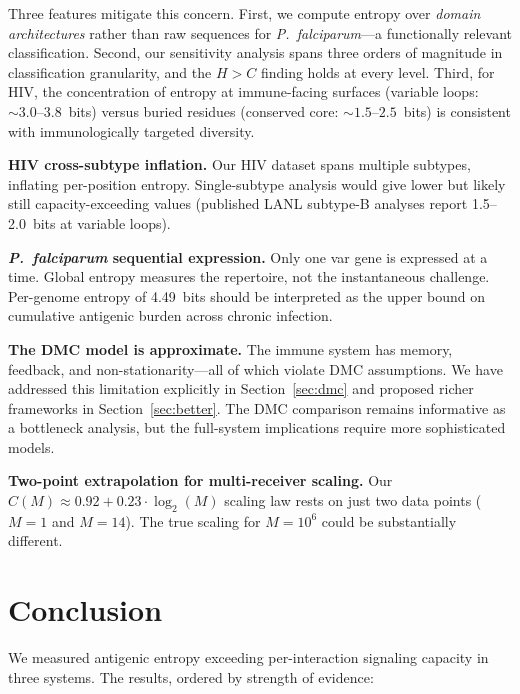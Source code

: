 \documentclass[twocolumn,10pt]{article}
\begin{document}
Three features mitigate this concern.  First, we compute entropy over \emph{domain architectures} rather than raw sequences for \textit{P.~falciparum}---a functionally relevant classification.  Second, our sensitivity analysis spans three orders of magnitude in classification granularity, and the $H > C$ finding holds at every level.  Third, for HIV, the concentration of entropy at immune-facing surfaces (variable loops: ${\sim}3.0\text{--}3.8$~bits) versus buried residues (conserved core: ${\sim}1.5\text{--}2.5$~bits) is consistent with immunologically targeted diversity.

\textbf{HIV cross-subtype inflation.}  Our HIV dataset spans multiple subtypes, inflating per-position entropy.  Single-subtype analysis would give lower but likely still capacity-exceeding values (published LANL subtype-B analyses report 1.5--2.0~bits at variable loops).

\textbf{\textit{P.~falciparum} sequential expression.}  Only one var gene is expressed at a time.  Global entropy measures the repertoire, not the instantaneous challenge.  Per-genome entropy of 4.49~bits should be interpreted as the upper bound on cumulative antigenic burden across chronic infection.

\textbf{The DMC model is approximate.}  The immune system has memory, feedback, and non-stationarity---all of which violate DMC assumptions.  We have addressed this limitation explicitly in Section~\ref{sec:dmc} and proposed richer frameworks in Section~\ref{sec:better}.  The DMC comparison remains informative as a bottleneck analysis, but the full-system implications require more sophisticated models.

\textbf{Two-point extrapolation for multi-receiver scaling.}  Our $C(M) \approx 0.92 + 0.23 \cdot \log_2(M)$ scaling law rests on just two data points ($M = 1$ and $M = 14$).  The true scaling for $M = 10^6$ could be substantially different.

\section{Conclusion}
\label{sec:conclusion}

We measured antigenic entropy exceeding per-interaction signaling capacity in three systems.  The results, ordered by strength of evidence:
\end{document}
